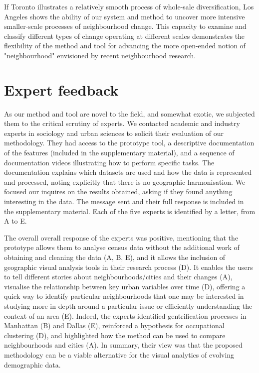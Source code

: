 If Toronto illustrates a relatively smooth process of whole-sale
diversification, Los Angeles shows the ability of our system and method to
uncover more intensive smaller-scale processes of neighbourhood change. This
capacity to examine and classify different types of change operating at
different scales demonstrates the flexibility of the method and tool for
advancing the more open-ended notion of "neighbourhood" envisioned by recent
neighbourhood research. 



\section{Expert feedback}
\label{sec:expert}
As our method and tool are novel to the field, and somewhat exotic,  we
subjected them to the critical scrutiny of experts. We contacted academic and
industry experts in sociology and urban sciences to solicit their evaluation of
our methodology. They had access to the prototype tool, a descriptive
documentation of the features (included in the supplementary material), and a
sequence of documentation videos illustrating how to perform specific tasks. The
documentation explains which datasets are used and how the data is represented
and processed, noting explicitly that there is no geographic harmonisation. We
focused our inquires on the results obtained, asking if they found anything
interesting in the data. The message sent and their full response is included in
the supplementary material. Each of the five experts is identified by a letter,
from A to E. 



The overall overall response of the experts was positive,  mentioning that the
prototype allows them to analyse census data without the additional work of
obtaining and cleaning the data (A, B, E), and it allows the inclusion of
geographic visual analysis tools in their research process (D). It enables the
users to tell different stories about neighbourhoods/cities and their changes
(A), visualise the relationship between key urban variables over time (D),
offering a quick way to identify particular neighbourhoods that one may be
interested in studying more in depth around a particular issue or efficiently
understanding the context of an area (E).  Indeed, the experts identified
gentrification processes in Manhattan (B) and Dallas (E), reinforced a
hypothesis for occupational clustering (D), and highlighted how the method can
be used to compare neighbourhoods and cities (A). In summary, their view was that
the proposed methodology can be a viable alternative for the visual analytics of
evolving demographic data.




